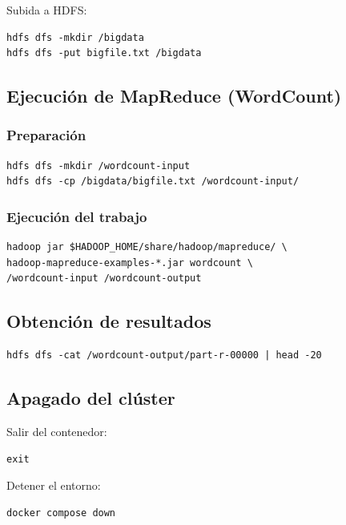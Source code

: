 Subida a HDFS:

\begin{verbatim}
hdfs dfs -mkdir /bigdata
hdfs dfs -put bigfile.txt /bigdata
\end{verbatim}

\subsection{Ejecución de MapReduce (WordCount)}

\subsubsection*{Preparación}

\begin{verbatim}
hdfs dfs -mkdir /wordcount-input
hdfs dfs -cp /bigdata/bigfile.txt /wordcount-input/
\end{verbatim}

\subsubsection*{Ejecución del trabajo}

\begin{verbatim}
hadoop jar $HADOOP_HOME/share/hadoop/mapreduce/ \
hadoop-mapreduce-examples-*.jar wordcount \
/wordcount-input /wordcount-output
\end{verbatim}

\subsection{Obtención de resultados}

\begin{verbatim}
hdfs dfs -cat /wordcount-output/part-r-00000 | head -20
\end{verbatim}

\subsection{Apagado del clúster}

Salir del contenedor:

\begin{verbatim}
exit
\end{verbatim}

Detener el entorno:

\begin{verbatim}
docker compose down
\end{verbatim}

